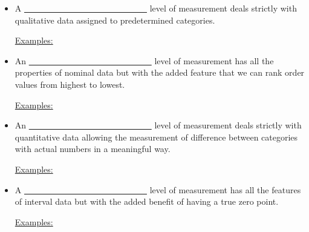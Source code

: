 \documentclass[12pt, letterpaper]{article}
\theoremstyle{definition}
\begin{document}
\begin{itemize}

\item A \underline{~~~~~~~~~~~~~~~~~~~~~~~~~~~~~} level of measurement deals strictly with qualitative data assigned to predetermined categories.\\
\vspace*{.3in}

\hspace*{.5in} \underline{Examples:}

\vspace*{.3in}

\item An \underline{~~~~~~~~~~~~~~~~~~~~~~~~~~~~~} level of measurement has all the properties of nominal data but with the added feature that we can rank order values from highest to lowest.\\
\vspace*{.3in}

\hspace*{.5in} \underline{Examples:}

\vspace*{.3in}

\item An \underline{~~~~~~~~~~~~~~~~~~~~~~~~~~~~~} level of measurement  deals strictly with quantitative data allowing the measurement of difference between categories with actual numbers in a meaningful way.\\
\vspace*{.3in}

\hspace*{.5in} \underline{Examples:}

\vspace*{.3in}

\item A \underline{~~~~~~~~~~~~~~~~~~~~~~~~~~~~~} level of measurement has all the features of interval data but with the added benefit of having a true zero point.\\
\vspace*{.3in}

\hspace*{.5in} \underline{Examples:}

\vspace*{.3in}

\end{itemize}

\newpage
\end{document}
